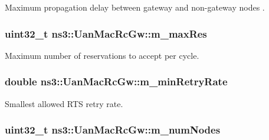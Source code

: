 Maximum propagation delay between gateway and non-\/gateway nodes . 

\subsubsection[{\texorpdfstring{m\+\_\+max\+Res}{m_maxRes}}]{\setlength{\rightskip}{0pt plus 5cm}uint32\+\_\+t ns3\+::\+Uan\+Mac\+Rc\+Gw\+::m\+\_\+max\+Res\hspace{0.3cm}{\ttfamily [private]}}\hypertarget{classns3_1_1UanMacRcGw_a14fb67143992d3c9f81e27f5647045e1}{}\label{classns3_1_1UanMacRcGw_a14fb67143992d3c9f81e27f5647045e1}


Maximum number of reservations to accept per cycle. 

\subsubsection[{\texorpdfstring{m\+\_\+min\+Retry\+Rate}{m_minRetryRate}}]{\setlength{\rightskip}{0pt plus 5cm}double ns3\+::\+Uan\+Mac\+Rc\+Gw\+::m\+\_\+min\+Retry\+Rate\hspace{0.3cm}{\ttfamily [private]}}\hypertarget{classns3_1_1UanMacRcGw_a1b80a997bc4b47fad40ee75304605786}{}\label{classns3_1_1UanMacRcGw_a1b80a997bc4b47fad40ee75304605786}


Smallest allowed R\+TS retry rate. 

\subsubsection[{\texorpdfstring{m\+\_\+num\+Nodes}{m_numNodes}}]{\setlength{\rightskip}{0pt plus 5cm}uint32\+\_\+t ns3\+::\+Uan\+Mac\+Rc\+Gw\+::m\+\_\+num\+Nodes\hspace{0.3cm}{\ttfamily [private]}}\hypertarget{classns3_1_1UanMacRcGw_a00185ef8e5203de223265077a3ad2cf4}{}\label{classns3_1_1UanMacRcGw_a00185ef8e5203de223265077a3ad2cf4}


